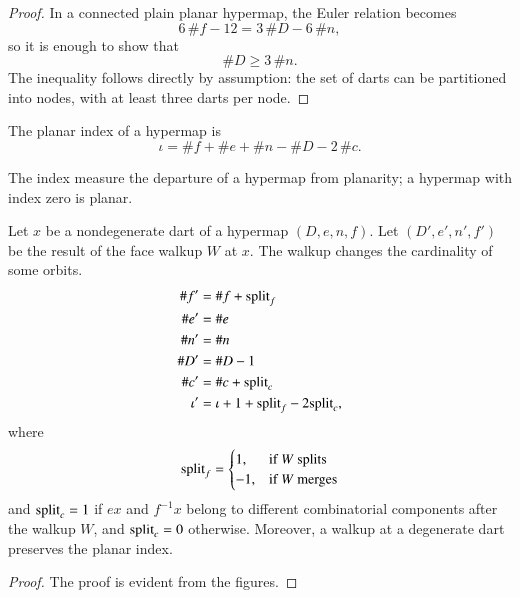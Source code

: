 \begin{proof}  In a connected plain planar hypermap, the Euler relation becomes
\[ 6\, \#f - 12 = 3\,\#D - 6\,\#n,\] 
so it is enough to show that
\[ 
\# D \ge 3\,\#n.
\] 
The inequality follows directly by assumption: the set of darts can be
partitioned into nodes, with at least three darts per node.
\end{proof}


\begin{definition}
The planar index of a hypermap is
\[ \iota = \# f + \# e + \# n - \# D - 2\,\#
c.\] 
%
%
\end{definition}

The index measure the departure of a hypermap from planarity; a
hypermap with index zero is planar.

\begin{lemma}\label{lemma:index} 
Let $x$ be a nondegenerate dart of a hypermap $(D,e,n,f)$. Let
$(D',e',n',f')$ be the result of the face walkup $W$ at $x$.  The
walkup changes the cardinality of some orbits.
\begin{align*}
\# f' &=\# f +{\operatorname{split}}_f  \\  
\# e'&=\# e \\
\# n'&=\# n \\
\# D'&=\# D - 1 \\
\#c'&=\# c + {\operatorname{split}}_c\\
\iota' &= \iota + 1+{\operatorname{split}}_f - 2{\operatorname{split}}_c,\\
\end{align*}
where
\[ 
{\operatorname{split}}_f = \begin{cases}
1,&\text{if $W$ splits }\\
-1,&\text{if $W$ merges}\\
\end{cases}
\] 
and ${\operatorname{split}}_c=1$ if $e x$ and $f^{-1} x$ belong to different
combinatorial components after the walkup $W$, and ${\operatorname{split}}_c=0$
otherwise. Moreover, a walkup at a degenerate dart preserves the
planar index.  %
%
%
\end{lemma}

\begin{proof} The proof is evident from the figures.
\end{proof}

